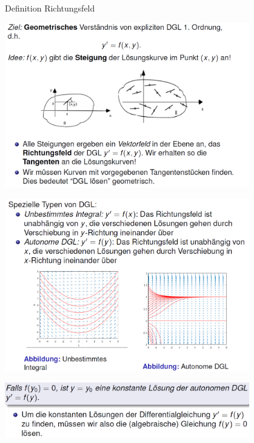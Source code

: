 \begin{definition}{Definition Richtungsfeld}\\
  \begin{centering}
  \includegraphics[width=0.8\textwidth]{images/2024-06-02-22-06-02.png}\\
  \end{centering}
  \begin{centering}
  \includegraphics[width=0.8\textwidth]{images/2024-06-02-22-07-30.png}\\
  \end{centering}
  \begin{centering}
  \includegraphics[width=0.8\textwidth]{images/2024-06-02-22-08-12.png}\\
  \end{centering}
\end{definition}
